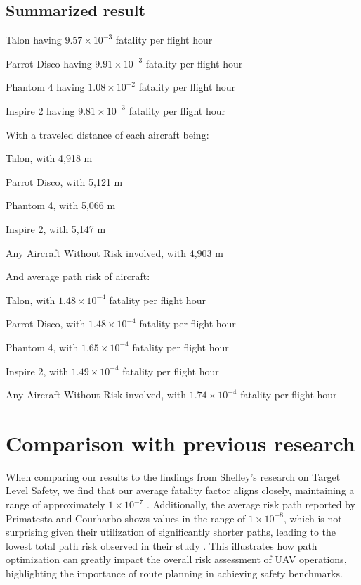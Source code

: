 \documentclass[12pt]{report}
\begin{document}
    \subsection{Summarized result}
        \begin{myitemize}
            \item Talon having $9.57 \times 10^{-3}$ fatality per flight hour
            \item Parrot Disco having $9.91 \times 10^{-3}$ fatality per flight hour
            \item Phantom 4 having $1.08 \times 10^{-2}$ fatality per flight hour
            \item Inspire 2 having $9.81 \times 10^{-3}$ fatality per flight hour
        \end{myitemize}
        With a traveled distance of each aircraft being:
        \begin{myitemize}
            \item Talon, with 4,918 m
            \item Parrot Disco, with 5,121 m
            \item Phantom 4, with 5,066 m
            \item Inspire 2, with 5,147 m
            \item Any Aircraft Without Risk involved, with 4,903 m
        \end{myitemize}
        And average path risk of aircraft:
        \begin{myitemize}
            \item Talon, with $1.48 \times 10^{-4}$ fatality per flight hour
            \item Parrot Disco, with $1.48 \times 10^{-4}$ fatality per flight hour
            \item Phantom 4, with $1.65 \times 10^{-4}$ fatality per flight hour
            \item Inspire 2, with $1.49 \times 10^{-4}$ fatality per flight hour
            \item Any Aircraft Without Risk involved, with $1.74 \times 10^{-4}$ fatality per flight hour
        \end{myitemize}


    \section{Comparison with previous research}
    When comparing our results to the findings from Shelley’s research on Target Level Safety, we find that our average
    fatality factor aligns closely, maintaining a range of approximately \(1 \times 10^{-7}\) \cite{shelley_model_2016}.
    Additionally, the average risk path reported by Primatesta and Courharbo shows values in the range of \(1 \times
    10^{-8}\), which is not surprising given their utilization of significantly shorter paths, leading to the lowest
    total path risk observed in their study \cite{primatesta_risk-based_2020}. This illustrates how path optimization
    can greatly impact the overall risk assessment of UAV operations, highlighting the importance of route planning in
    achieving safety benchmarks.
\end{document}

